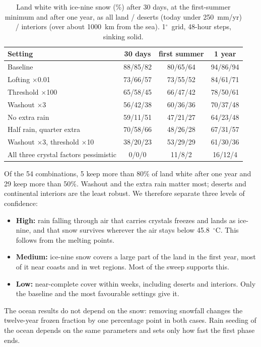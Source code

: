 \documentclass[11pt,a4paper]{article}
\newcommand{\degC}{$^{\circ}$C}
\newcommand{\degree}{$^{\circ}$}
\begin{document}
\begin{table}[htbp]
\centering\small
\caption{Land white with ice-nine snow (\%) after 30 days, at the first-summer minimum and after one year, as all land / deserts (today under 250~mm/yr) / interiors (over about 1000~km from the sea). 1\degree\ grid, 48-hour steps, sinking solid.}
\label{tab:snowsens}
\begin{tabular}{lccc}
\toprule
Setting & 30 days & first summer & 1 year \\
\midrule
Baseline & 88/85/82 & 80/65/64 & 94/86/94 \\
Lofting $\times$0.01 & 73/66/57 & 73/55/52 & 84/61/71 \\
Threshold $\times$100 & 65/58/45 & 66/47/42 & 78/50/61 \\
Washout $\times$3 & 56/42/38 & 60/36/36 & 70/37/48 \\
No extra rain & 59/11/51 & 47/21/27 & 64/23/48 \\
Half rain, quarter extra & 70/58/66 & 48/26/28 & 67/31/57 \\
Washout $\times$3, threshold $\times$10 & 38/20/23 & 53/29/29 & 61/30/36 \\
All three crystal factors pessimistic & 0/0/0 & 11/8/2 & 16/12/4 \\
\bottomrule
\end{tabular}
\end{table}

Of the 54 combinations, 5 keep more than 80\% of land white after one year and 29 keep more than 50\%. Washout and the extra rain matter most; deserts and continental interiors are the least robust. We therefore separate three levels of confidence:
\begin{itemize}
\item \textbf{High:} rain falling through air that carries crystals freezes and lands as ice-nine, and that snow survives wherever the air stays below 45.8~\degC. This follows from the melting points.
\item \textbf{Medium:} ice-nine snow covers a large part of the land in the first year, most of it near coasts and in wet regions. Most of the sweep supports this.
\item \textbf{Low:} near-complete cover within weeks, including deserts and interiors. Only the baseline and the most favourable settings give it.
\end{itemize}
The ocean results do not depend on the snow: removing snowfall changes the twelve-year frozen fraction by one percentage point in both cases. Rain seeding of the ocean depends on the same parameters and sets only how fast the first phase ends.
\end{document}
